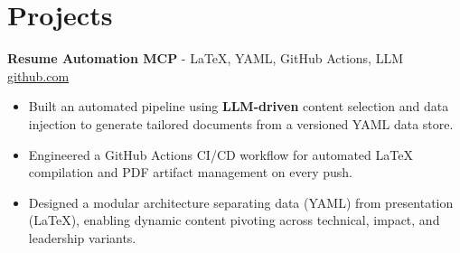 \documentclass[11pt]{article}       %
\begin{document}
\vspace{-18.5pt}

\section*{Projects}

\textbf{Resume Automation MCP}{ - LaTeX, YAML, GitHub Actions, LLM} \hfill \href{https://github.com/Monica20030707/Tex_OrangeLeaf-mcp}{github.com} \\
\vspace{-9pt}
\begin{itemize}
  \item Built an automated pipeline using \textbf{LLM-driven} content selection and data injection to generate tailored documents from a versioned YAML data store.
  \item Engineered a GitHub Actions CI/CD workflow for automated LaTeX compilation and PDF artifact management on every push.
  \item Designed a modular architecture separating data (YAML) from presentation (LaTeX), enabling dynamic content pivoting across technical, impact, and leadership variants.
\end{itemize}

\end{document}
